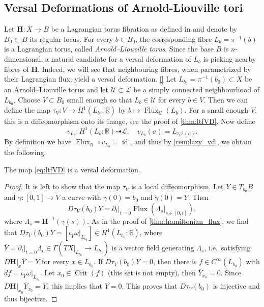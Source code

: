 \documentclass[12pt,a4paper,draft]{scrartcl}
\DeclareMathOperator{\id}{id}
\DeclareMathOperator{\Flux}{Flux}
\DeclareMathOperator{\Crit}{Crit}
\begin{document}
\subsection{Versal Deformations of Arnold-Liouville tori}
\label{sec:vd_AL}

Let $\symbf{H} \colon X \rightarrow B$ be a Lagrangian torus fibration as defined in \cite{evans2021atfs} and denote by $B_0 \subset B$ its regular locus. For every $b \in B_0$, the corresponding fibre $L_b = \pi^{-1}(b)$ is a Lagrangian torus, called \emph{Arnold--Liouville torus}. Since the base $B$ is $n$-dimensional, a natural candidate for a versal deformation of $L_b$ is picking nearby fibres of $\symbf{H}$. Indeed, we will see that neighbouring fibres, when parametrized by their Lagrangian flux, yield a versal deformation. 
\ref{}
Let $L_{b_0} = \pi^{-1}(b_0) \subset X$ be an Arnold--Liouville torus and let $\mathcal{U} \subset \mathcal{L}$ be a simply connected neighbourhood of $L_{b_0}$. Choose $V \subset B_0$ small enough so that $L_b \in \mathcal{U}$ for every $b \in V$. Then we can define the map $τ_V \colon V \rightarrow H^1(L_{b_0};\mathbb{R})$ by $b \mapsto \Flux_{\mathcal{U}}(L_b)$. For a small enough $V$, this is a diffeomorphism onto its image, see the proof of \cref{thm:ltfVD}. Now define
\begin{equation}
    \label{eq:ltfVD}
    v_{L_b} \colon H^1(L_b;\mathbb{R}) \dashrightarrow \mathcal{L}, \quad
    v_{L_b}(a) = L_{τ_V^{-1}(a)}.
\end{equation}
By definition we have $\Flux_{\mathcal{U}} \circ v_{L_b} = \id$, and thus by \cref{rem:lazy_vd}, we obtain the following. 

\begin{proposition}
    \label{thm:ltfVD}
    The map \eqref{eq:ltfVD} is a versal deformation. 
\end{proposition}

\begin{proof}
    It is left to show that the map $τ_V$ is a local diffeomorphism.
    Let $Y \in T_{b_0}B$ and $\gamma \colon [0,1] \rightarrow V$ a curve with $\gamma(0) = b_0$ and $\dot{\gamma}(0) = Y$.
    Then 
    \[
        \label{eq:Dphi}
        Dτ_V(b_0) Y = \partial_t\vert_{t = 0} \Flux (\Lambda_s\vert_{s \in [0,t]}),
    \]
    where $\Lambda_s = \mathbf{H}^{-1}(\gamma(s))$.
    As in the proof of \cref{thm:hamiltonian_flux}, we find that $Dτ_V(b_0) Y = [\iota_{\overline{Y}}\omega \vert_{L_{b_0}}] \in H^1(L_{b_0};\mathbb{R})$, where $\overline{Y} = \partial_t \vert_{t=0} \Lambda_t \in \Gamma(TX\vert_{L_{b_0}} \rightarrow L_{b_0})$ is a vector field generating $\Lambda_s$, i.e.\ satisfying $D\mathbf{H}\vert_x \overline{Y} = Y$ for every $x \in L_{b_0}$.
    If $Dτ_V(b_0) Y = 0$, then there is $f \in C^{\infty}(L_{b_0})$ with $df = \iota_{\overline{Y}}\omega \vert_{L_{b_0}}$.
    Let $x_0 \in \Crit(f)$ (this set is not empty), then $\overline{Y}_{x_0} = 0$.
    Since $D\mathbf{H} \vert_{x_0} \overline{Y}_{x_0} = Y$, this implies that $Y = 0$.
    This proves that $Dτ_V(b_0)$ is injective and thus bijective. 
\end{proof}
\end{document}
